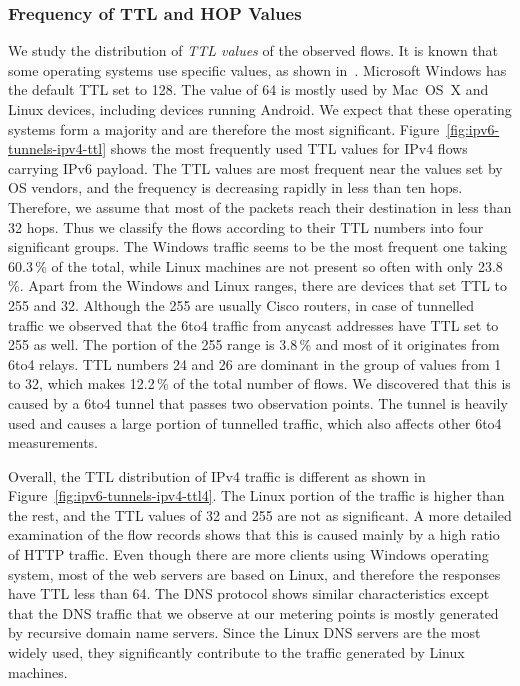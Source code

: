 \subsubsection{Frequency of TTL and HOP Values}
We study the distribution of \textit{TTL values} of the observed flows. It is known that some operating systems use specific values, as shown in~\cite{Davids-2017-Initial}. Microsoft Windows has the default TTL set to 128. The value of 64 is mostly used by Mac~OS~X and Linux devices, including devices running Android. We expect that these operating systems form a majority and are therefore the most significant. Figure~\ref{fig:ipv6-tunnels-ipv4-ttl} shows the most frequently used TTL values for IPv4 flows carrying IPv6 payload. The TTL values are most frequent near the values set by OS vendors, and the frequency is decreasing rapidly in less than ten hops. Therefore, we assume that most of the packets reach their destination in less than 32 hops. Thus we classify the flows according to their TTL numbers into four significant groups. The Windows traffic seems to be the most frequent one taking 60.3\,\% of the total, while Linux machines are not present so often with only 23.8\,\%. Apart from the Windows and Linux ranges, there are devices that set TTL to 255 and 32. Although the 255 are usually Cisco routers, in case of tunnelled traffic we observed that the 6to4 traffic from anycast addresses have TTL set to 255 as well. The portion of the 255 range is 3.8\,\% and most of it originates from 6to4 relays. TTL numbers 24 and 26 are dominant in the group of values from 1 to 32, which makes 12.2\,\% of the total number of flows. We discovered that this is caused by a 6to4 tunnel that passes two observation points. The tunnel is heavily used and causes a large portion of tunnelled traffic, which also affects other 6to4 measurements.

Overall, the TTL distribution of IPv4 traffic is different as shown in Figure~\ref{fig:ipv6-tunnels-ipv4-ttl4}. The Linux portion of the traffic is higher than the rest, and the TTL values of 32 and 255 are not as significant. A more detailed examination of the flow records shows that this is caused mainly by a high ratio of HTTP traffic. Even though there are more clients using Windows operating system, most of the web servers are based on Linux, and therefore the responses have TTL less than 64. The DNS protocol shows similar characteristics except that the DNS traffic that we observe at our metering points is mostly generated by recursive domain name servers. Since the Linux DNS servers are the most widely used, they significantly contribute to the traffic generated by Linux machines.

